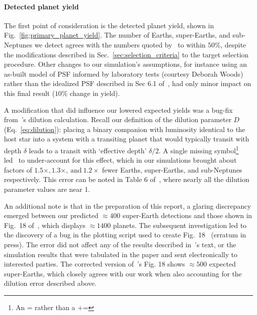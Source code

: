 \paragraph{Detected planet yield}
The first point of consideration is the detected planet yield, shown in Fig.~\ref{fig:primary_planet_yield}.
The number of Earths, super-Earths, and sub-Neptunes we detect agrees with the 
numbers quoted by~ to within $50\%$, despite the 
modifications described in Sec.~\ref{sec:selection_criteria} to the target 
selection procedure.
Other changes to our simulation's assumptions, for instance using an as-built 
model of \tesss PSF informed by laboratory tests (courtesy Deborah Woods) 
rather than the idealized PSF described in Sec 6.1 
of~, had only minor impact on this final result 
($10\%$ change in yield).

A modification that did influence our lowered expected yields was a bug-fix 
from~'s dilution calculation. Recall our definition 
of 
the dilution parameter $D$ (Eq.~\ref{eq:dilution}): placing a binary companion 
with luminosity identical to the host star into a system with a transiting 
planet that would typically transit with depth $\delta$ leads to a transit with 
`effective depth' $\delta/2$. A single missing symbol\footnote{An $\texttt{=}$ rather than 
a $\texttt{+=}$} led~ to under-account for this 
effect, which 
in our simulations brought about factors of $1.5\times, 1.3\times,\ 
\mathrm{and}\ 1.2\times$ fewer Earths, super-Earths, and sub-Neptunes 
respectively. This error can be noted in Table 6 
of~, where nearly all the dilution parameter 
values are near 1.


An additional note is that in the preparation of this report, a glaring 
discrepancy emerged between our predicted $\approx 400$ super-Earth detections 
and those shown in Fig.~18 of~\citetalias{Sullivan_2015}, which 
displays $\approx 1400$ planets. The subsequent investigation led to the 
discovery of a bug in the plotting script used to create 
Fig.~18~ (erratum in press). The 
error did not
affect any of the results described in~'s text, or 
the simulation results that were tabulated in the paper and sent electronically 
to interested parties.
The corrected version 
of~'s Fig. 18 shows $\approx 500$ expected 
super-Earths, which closely agrees with our work when also accounting for the 
dilution error described above.


